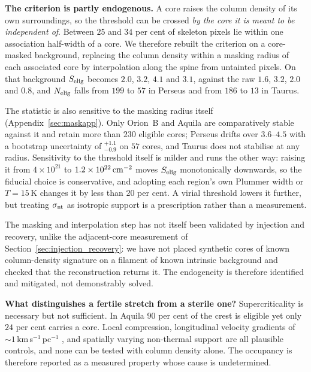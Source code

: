 \documentclass[usenatbib,twoside,twocolumn]{mnras}
\begin{document}
\smallskip\noindent\textbf{The criterion is partly endogenous.} A core raises the column density of its own surroundings, so the threshold can be crossed \emph{by the core it is meant to be independent of}. Between $25$ and $34$ per cent of skeleton pixels lie within one association half-width of a core. We therefore rebuilt the criterion on a core-masked background, replacing the column density within a masking radius of each associated core by interpolation along the spine from untainted pixels. On that background $S_{\rm elig}$ becomes $2.0$, $3.2$, $4.1$ and $3.1$, against the raw $1.6$, $3.2$, $2.0$ and $0.8$, and $N_{\rm elig}$ falls from $199$ to $57$ in Perseus and from $186$ to $13$ in Taurus.

The statistic is also sensitive to the masking radius itself (Appendix~\ref{sec:maskapp}). Only Orion~B and Aquila are comparatively stable against it and retain more than $230$ eligible cores; Perseus drifts over $3.6$--$4.5$ with a bootstrap uncertainty of $^{+1.1}_{-0.9}$ on $57$ cores, and Taurus does not stabilise at any radius. Sensitivity to the threshold itself is milder and runs the other way: raising it from $4\times10^{21}$ to $1.2\times10^{22}\,{\rm cm^{-2}}$ moves $S_{\rm elig}$ monotonically downwards, so the fiducial choice is conservative, and adopting each region's own Plummer width or $T=15$\,K changes it by less than $20$ per cent. A virial threshold lowers it further, but treating $\sigma_{\rm nt}$ as isotropic support is a prescription rather than a measurement.

The masking and interpolation step has not itself been validated by injection and recovery, unlike the adjacent-core measurement of Section~\ref{sec:injection_recovery}: we have not placed synthetic cores of known column-density signature on a filament of known intrinsic background and checked that the reconstruction returns it. The endogeneity is therefore identified and mitigated, not demonstrably solved.

\smallskip\noindent\textbf{What distinguishes a fertile stretch from a sterile one?} Supercriticality is necessary but not sufficient. In Aquila $90$ per cent of the crest is eligible yet only $24$ per cent carries a core. Local compression, longitudinal velocity gradients of $\sim1$\,km\,s$^{-1}$\,pc$^{-1}$ \citep{Kirk2013,Hacar2013}, and spatially varying non-thermal support are all plausible controls, and none can be tested with column density alone. The occupancy is therefore reported as a measured property whose cause is undetermined.
\end{document}
